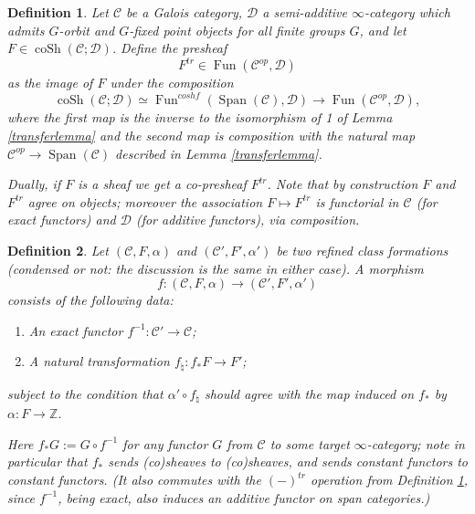 \documentclass[10pt,a4paper]{amsart}
\newtheorem{definition}{Definition}
\newcommand{\mbb}{\mathbb}
\newcommand{\mc}{\mathcal}
\newcommand{\on}{\operatorname}
\begin{document}
\begin{definition}\label{trfunctor}
Let $\mc{C}$ be a Galois category, $\mc{D}$ a semi-additive $\infty$-category which admits $G$-orbit and $G$-fixed point objects for all finite groups $G$, and let $F\in \on{coSh}(\mc{C};\mc{D})$.  Define the presheaf
$$F^{tr} \in \on{Fun}(\mc{C}^{op},\mc{D})$$
as the image of $F$ under the composition
$$\on{coSh}(\mc{C};\mc{D})\simeq\on{Fun}^{coshf}(\on{Span}(\mc{C}),\mc{D})\rightarrow \on{Fun}(\mc{C}^{op},\mc{D}),$$
where the first map is the inverse to the isomorphism of 1 of Lemma \ref{transferlemma} and the second map is composition with the natural map $\mc{C}^{op}\to\on{Span}(\mc{C})$ described in Lemma \ref{transferlemma}.

Dually, if $F$ is a sheaf we get a co-presheaf $F^{tr}$.  Note that by construction $F$ and $F^{tr}$ agree on objects; moreover the association $F\mapsto F^{tr}$ is functorial in $\mc{C}$ (for exact functors) and $\mc{D}$ (for additive functors), via composition.
\end{definition}

\begin{definition}\label{maprcf}
Let $(\mc{C},F,\alpha)$ and $(\mc{C}',F',\alpha')$ be two refined class formations (condensed or not: the discussion is the same in either case).  A morphism 
$$f:(\mc{C},F,\alpha)\to (\mc{C}',F',\alpha')$$
consists of the following data:
\begin{enumerate}
\item An exact functor $f^{-1}:\mc{C}'\to\mc{C}$;
\item A natural transformation $f_\natural: f_\ast F \to F'$;
\end{enumerate}
subject to the condition that $\alpha'\circ f_\natural$ should agree with the map induced on $f_\ast$ by $\alpha:F\to\mbb{Z}$.

Here $f_\ast G := G\circ f^{-1}$ for any functor $G$ from $\mc{C}$ to some target $\infty$-category; note in particular that $f_\ast$ sends (co)sheaves to (co)sheaves, and sends constant functors to constant functors.  (It also commutes with the $(-)^{tr}$ operation from Definition \ref{trfunctor}, since $f^{-1}$, being exact, also induces an additive functor on span categories.)
\end{definition}
\end{document}
